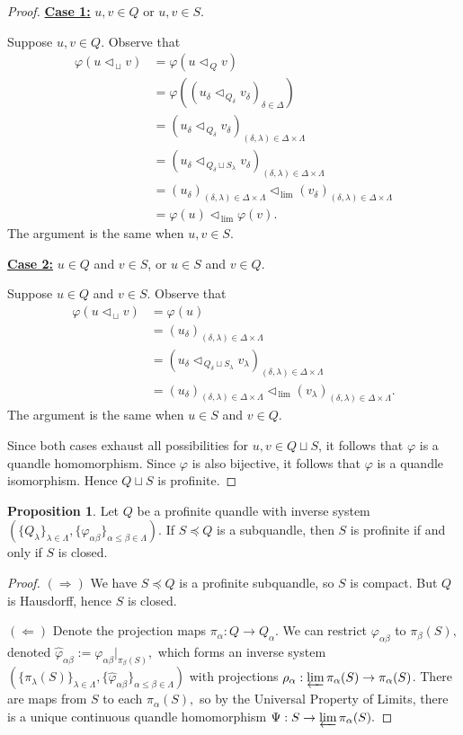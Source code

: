 \documentclass[reqno,dvipsnames]{amsart}
\newcommand{\ul}{\underline}
\renewcommand{\d}{\delta}
\newcommand{\tl}{\triangleleft}
\newcommand{\tll}{\triangleleft_{\,\lim}}
\newcommand{\tlsq}{\triangleleft_{\,\sqcup}}
\renewcommand{\phi}{\varphi}
\theoremstyle{definition}
\newtheorem{proposition}[theorem]{Proposition}
\begin{document}
{\begin{proof}
\ul{\textbf{Case 1:}} $u,v\in Q$ or $u,v\in S$.

Suppose $u,v\in Q$. Observe that
\begin{align*}
\phi(u\tlsq v)
&=\phi(u\tl_{\,Q}v)\\
&=\phi((u_\d\tl_{\,Q_\d}v_\d)_{\d\in\Delta})\\
&=(u_\d\tl_{\,Q_\d}v_\d)_{(\d,\lambda)\in\Delta\times\Lambda}\\
&=(u_\d\tl_{\,Q_\d\sqcup S_\lambda}v_\d)_{(\d,\lambda)\in\Delta\times\Lambda}\\
&=(u_\d)_{(\d,\lambda)\in\Delta\times\Lambda}\tll(v_\d)_{(\d,\lambda)\in\Delta\times\Lambda}\\
&=\phi(u)\tll\phi(v).
\end{align*}
The argument is the same when $u,v\in S$.

\ul{\textbf{Case 2:}} $u\in Q$ and $v\in S$, or $u\in S$ and $v\in Q$.

Suppose $u\in Q$ and $v\in S$. Observe that
\begin{align*}
\phi(u\tlsq v)
&=\phi(u)\\
&=(u_\d)_{(\d,\lambda)\in\Delta\times\Lambda}\\
&=(u_\d\tl_{\,Q_\d\sqcup S_\lambda}v_\lambda)_{(\d,\lambda)\in\Delta\times\Lambda}\\
&=(u_\delta)_{(\delta,\lambda)\in\Delta\times\Lambda}\tll(v_\lambda)_{(\d,\lambda)\in\Delta\times\Lambda}.
\end{align*}
The argument is the same when $u\in S$ and $v\in Q$.

Since both cases exhaust all possibilities for $u,v\in Q\sqcup S$, it follows that $\phi$ is a quandle homomorphism. Since $\phi$ is also bijective, it follows that $\phi$ is a quandle isomorphism. Hence $Q\sqcup S$ is profinite.
\end{proof}

\begin{proposition}
Let $Q$ be a profinite quandle with inverse system $(\{Q_\lambda\}_{\lambda \in \Lambda},\{\varphi_{\alpha\beta}\}_{\alpha \leq \beta \in \Lambda})$. If $S \preceq Q$ is a subquandle, then $S$ is profinite if and only if $S$ is closed.
\end{proposition}

\begin{proof}
$(\Rightarrow)$ We have $S \preceq Q$ is a profinite subquandle, so $S$ is compact. But $Q$ is Hausdorff, hence $S$ is closed.

$(\Leftarrow)$ Denote the projection maps $\pi_\alpha : Q \to Q_\alpha.$ We can restrict $\varphi_{\alpha\beta}$ to $\pi_\beta(S),$ denoted $\hat\varphi_{\alpha\beta} := \varphi_{\alpha\beta}|_{\pi_\beta(S)},$ which forms an inverse system $(\{\pi_\lambda(S)\}_{\lambda \in \Lambda},\{\hat\varphi_{\alpha\beta}\}_{\alpha \leq \beta \in \Lambda})$ with projections $\rho_\alpha : \varprojlim \pi_\alpha(S) \to \pi_\alpha(S)$. There are maps from $S$ to each $\pi_\alpha(S),$ so by the Universal Property of Limits, there is a unique continuous quandle homomorphism $\Psi: S \to \varprojlim \pi_\alpha(S).$


\end{proof}}
\end{document}
